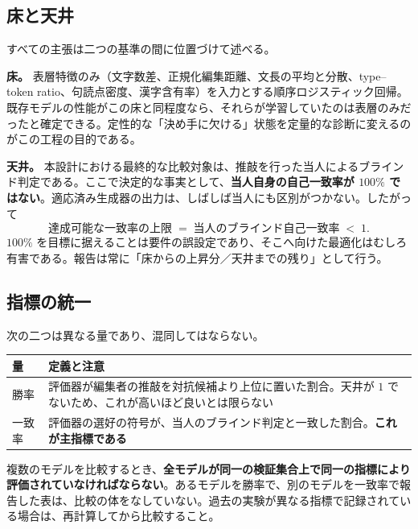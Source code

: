 \documentclass[a4paper,10.5pt]{ltjsarticle}
\begin{document}
\subsection{床と天井}

すべての主張は二つの基準の間に位置づけて述べる。

\textbf{床。} 表層特徴のみ（文字数差、正規化編集距離、文長の平均と分散、type--token ratio、句読点密度、漢字含有率）を入力とする順序ロジスティック回帰。既存モデルの性能がこの床と同程度なら、それらが学習していたのは表層のみだったと確定できる。定性的な「決め手に欠ける」状態を定量的な診断に変えるのがこの工程の目的である。

\textbf{天井。} 本設計における最終的な比較対象は、推敲を行った当人によるブラインド判定である。ここで決定的な事実として、\textbf{当人自身の自己一致率が $100\%$ ではない}。適応済み生成器の出力は、しばしば当人にも区別がつかない。したがって
\[
  \text{達成可能な一致率の上限} \;=\; \text{当人のブラインド自己一致率} \;<\; 1 .
\]
$100\%$ を目標に据えることは要件の誤設定であり、そこへ向けた最適化はむしろ有害である。報告は常に「床からの上昇分／天井までの残り」として行う。

\subsection{指標の統一}

次の二つは異なる量であり、混同してはならない。

\begin{center}
\begin{tabularx}{\textwidth}{@{}p{10em} X@{}}
\toprule
\sffamily\bfseries 量 & \sffamily\bfseries 定義と注意 \\
\midrule
勝率 & 評価器が編集者の推敲を対抗候補より上位に置いた割合。天井が $1$ でないため、これが高いほど良いとは限らない \\
一致率 & 評価器の選好の符号が、当人のブラインド判定と一致した割合。\textbf{これが主指標である} \\
\bottomrule
\end{tabularx}
\end{center}

\begin{warnbox}[title=比較可能性の要件]
複数のモデルを比較するとき、\textbf{全モデルが同一の検証集合上で同一の指標により評価されていなければならない}。あるモデルを勝率で、別のモデルを一致率で報告した表は、比較の体をなしていない。過去の実験が異なる指標で記録されている場合は、再計算してから比較すること。
\end{warnbox}
\end{document}
